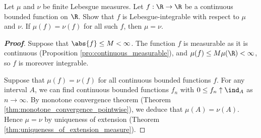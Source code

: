 \begin{proposition}
Let $\mu$ and $\nu$ be finite Lebesgue measures. Let $f: \R\to \R$ be a continuous bounded function on $\R$. Show that $f$ is Lebesgue-integrable with respect to $\mu$ and $\nu$. If $\mu(f)=\nu(f)$ for all such $f$, then $\mu=\nu$.
\end{proposition}

\begin{proof}[\bf Proof]
Suppose that $\abs{f} \leq M < \infty$. The function $f$ is measurable as it is continuous (Proposition \ref{pro:continuous_measurable}), and $\mu(f)\leq M \mu(\R)<\infty$, so $f$ is moreover integrable.

Suppose that $\mu(f)=\nu(f)$ for all continuous bounded functions $f$. For any interval $A$, we can find continuous bounded functions $f_n$ with $0\leq f_n\uparrow \ind_A$ as $n\to \infty$. By monotone convergence theorem (Theorem \ref{thm:monotone_convergence_pointwise}), we deduce that $\mu(A)=\nu(A)$. Hence $\mu=\nu$ by uniqueness of extension (Theorem \ref{thm:uniqueness_of_extension_measure}).
\end{proof}


